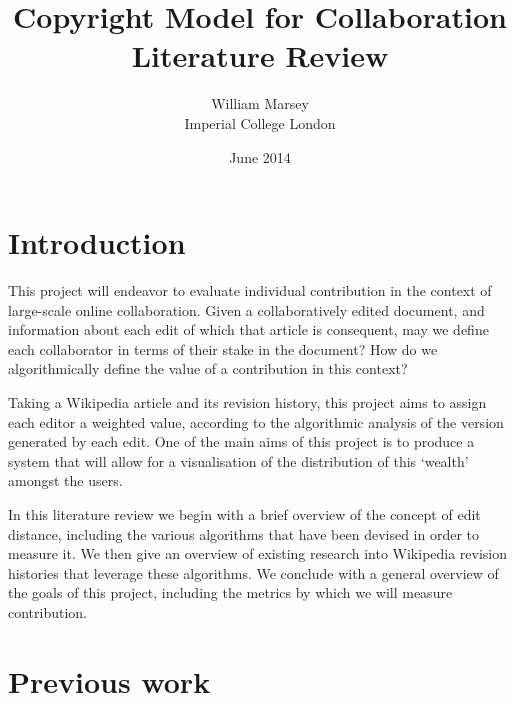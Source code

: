 \documentclass[a4paper,11pt,twoside,notitlepage]{article}
\begin{document}
	\title{Copyright Model for Collaboration
		\\ \small Literature Review}
	\author{William Marsey
		\\Imperial College London}
	\date{June 2014}
 	\maketitle	
        
        \tableofcontents

        \clearpage

        \section{Introduction}
        This project will endeavor to evaluate individual
        contribution in the context of large-scale online
        collaboration. Given a collaboratively edited document, and
        information about each edit of which that article is
        consequent, may we define each collaborator in terms of their
        stake in the document? How do we algorithmically define the
        value of a contribution in this context?

        Taking a Wikipedia article and its revision history, this
        project aims to assign each editor a weighted value, according
        to the algorithmic analysis of the version
        generated by each edit. One of the main aims of this project is to produce
        a system that will allow for a visualisation of the
        distribution of this `wealth' amongst the users.
        
        In this literature review we begin with a brief overview of
        the concept of edit distance, including the various algorithms
        that have been devised in order to measure it. We then give an
        overview of existing research into Wikipedia revision
        histories that leverage these algorithms. We conclude with a
        general overview of the goals of this project, including the
        metrics by which we will measure contribution.

        \section{Previous work}
\end{document}
